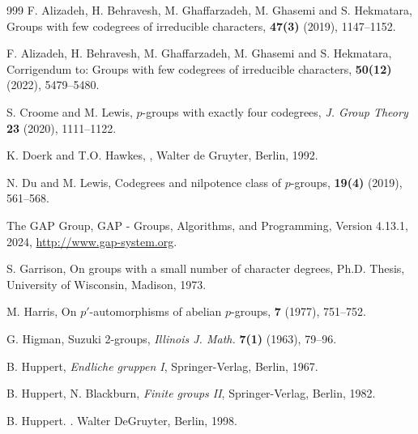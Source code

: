 \documentclass[9pt]{article}
\begin{document}
\begin{thebibliography}{999}\setlength{\itemsep}{-2mm} 
\small
	F. Alizadeh, H. Behravesh, M. Ghaffarzadeh, M. Ghasemi and S. Hekmatara,
	\newblock  Groups with few
	codegrees of irreducible characters,
	 {\bf47(3)} (2019), 1147--1152.

	F. Alizadeh, H. Behravesh, M. Ghaffarzadeh, M. Ghasemi and S. Hekmatara,
	\newblock Corrigendum to: Groups with few codegrees of irreducible characters,
	 {\bf50(12)} (2022), 5479--5480.





	S. Croome and M. Lewis,
	\newblock $p$-groups with exactly four codegrees,
	\newblock \emph{J. Group Theory} {\bf 23} (2020), 1111--1122.




	K. Doerk and T.O. Hawkes,
	,
	\newblock Walter de Gruyter, Berlin, 1992.

	N. Du and M. Lewis,
	\newblock  Codegrees and nilpotence class of $p$-groups,
	 {\bf19(4)} (2019), 561--568.

	 The GAP Group, GAP - Groups, Algorithms, and Programming, Version 4.13.1, 2024, \href{http://www.gap-system.org}{http://www.gap-system.org}.


	S. Garrison,
	\newblock  On groups with a small number of character degrees,
	\newblock Ph.D. Thesis, University of Wisconsin, Madison, 1973.




	M. Harris,
	\newblock On $p'$-automorphisms of abelian $p$-groups,
	 {\bf7} (1977), 751--752.

	G. Higman,
	\newblock Suzuki 2-groups,
	\emph{Illinois J. Math.} {\bf 7(1)} (1963), 79--96.
	
	B. Huppert,
	\newblock \emph{Endliche gruppen I},
	\newblock Springer-Verlag, Berlin, 1967.



   B. Huppert, N. Blackburn,
   \emph{Finite groups II},
    Springer-Verlag, Berlin, 1982.


	B. Huppert.
	.
	 \newblock Walter DeGruyter, Berlin, 1998.





\end{thebibliography}
\end{document}
